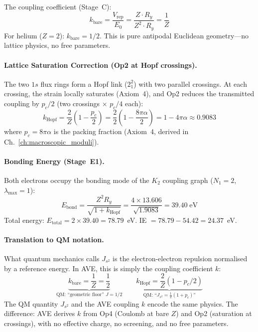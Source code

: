 The coupling coefficient (Stage~C):
\begin{equation}
    k_{\text{bare}} = \frac{V_{\text{rep}}}{E_0}
    = \frac{Z \cdot R_y}{Z^2 \cdot R_y}
    = \frac{1}{Z}
    \label{eq:k_bare_he}
\end{equation}
For helium ($Z = 2$): $k_{\text{bare}} = 1/2$.
This is pure antipodal Euclidean geometry---no lattice
physics, no free parameters.

\paragraph{Lattice Saturation Correction (Op2 at Hopf crossings).}
The two $1s$ flux rings form a Hopf link ($2_1^2$) with
two parallel crossings.  At each crossing, the strain
locally saturates (Axiom~4), and Op2 reduces the
transmitted coupling by $p_c/2$
(two crossings $\times$ $p_c/4$ each):
\begin{equation}
    k_{\text{Hopf}} = \frac{2}{Z}\!\left(1 - \frac{p_c}{2}\right)
    = \frac{2}{2}\!\left(1 - \frac{8\pi\alpha}{2}\right)
    = 1 - 4\pi\alpha
    \approx 0.9083
    \label{eq:k_hopf_he}
\end{equation}
where $p_c = 8\pi\alpha$ is the packing fraction
(Axiom~4, derived in Ch.~\ref{ch:macroscopic_moduli}).

\paragraph{Bonding Energy (Stage~E1).}
Both electrons occupy the bonding mode of the
$K_2$ coupling graph ($N_1 = 2$, $\lambda_{\max} = 1$):
\begin{equation}
    E_{\text{bond}} = \frac{Z^2 R_y}{\sqrt{1 + k_{\text{Hopf}}}}
    = \frac{4 \times 13.606}{\sqrt{1.9083}}
    = 39.40\;\text{eV}
\end{equation}
Total energy: $E_{\text{total}} = 2 \times 39.40 = 78.79$~eV.
IE $= 78.79 - 54.42 = 24.37$~eV.\;\checkmark

\paragraph{Translation to QM notation.}
What quantum mechanics calls $J_{s^2}$ is the electron-electron
repulsion normalised by a reference energy.  In AVE, this
is simply the coupling coefficient $k$:
\begin{equation}
    \underbrace{k_{\text{bare}} = \frac{1}{Z} = \frac{1}{2}}_{\text{QM:
    ``geometric floor'' $J = 1/2$}}
    \qquad
    \underbrace{k_{\text{Hopf}} = \frac{2}{Z}(1 - p_c/2)}_{\text{QM:
    ``$J_{s^2} = \tfrac{1}{2}(1 + p_c)$''}}
\end{equation}
The QM quantity $J_{s^2}$ and the AVE coupling $k$ encode
the same physics.  The difference: AVE derives $k$ from
Op4 (Coulomb at bare $Z$) and Op2 (saturation at crossings),
with no effective charge, no screening, and no free parameters.

